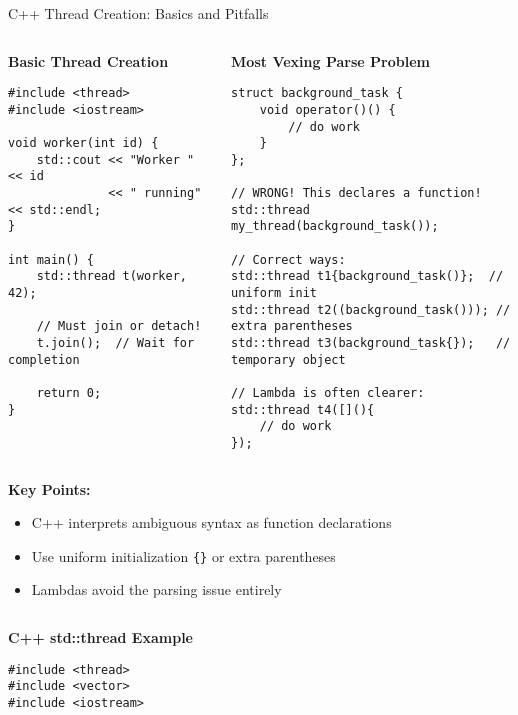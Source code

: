 \begin{frame}[fragile]{ C++ Thread Creation: Basics and Pitfalls}
	\begin{columns}
		\begin{column}{0.5\textwidth}
			\textbf{Basic Thread Creation}
			\begin{verbatim}
#include <thread>
#include <iostream>

void worker(int id) {
    std::cout << "Worker " << id
              << " running" << std::endl;
}

int main() {
    std::thread t(worker, 42);

    // Must join or detach!
    t.join();  // Wait for completion

    return 0;
}
			\end{verbatim}
		\end{column}
		\begin{column}{0.5\textwidth}
			\textbf{Most Vexing Parse Problem}
			\begin{verbatim}
struct background_task {
    void operator()() {
        // do work
    }
};

// WRONG! This declares a function!
std::thread my_thread(background_task());

// Correct ways:
std::thread t1{background_task()};  // uniform init
std::thread t2((background_task())); // extra parentheses
std::thread t3(background_task{});   // temporary object

// Lambda is often clearer:
std::thread t4([](){
    // do work
});
			\end{verbatim}
		\end{column}
	\end{columns}

	\vspace{0.5em}
	\textbf{Key Points:}
	\begin{itemize}
		\item C++ interprets ambiguous syntax as function declarations
		\item Use uniform initialization \texttt{\{\}} or extra parentheses
		\item Lambdas avoid the parsing issue entirely
	\end{itemize}
    \begin{columns}
	\begin{column}{0.5\textwidth}
		\textbf{C++ std::thread Example}
		\begin{verbatim}
#include <thread>
#include <vector>
#include <iostream>


\end{verbatim}
\end{column}
\end{columns}
\end{frame}

